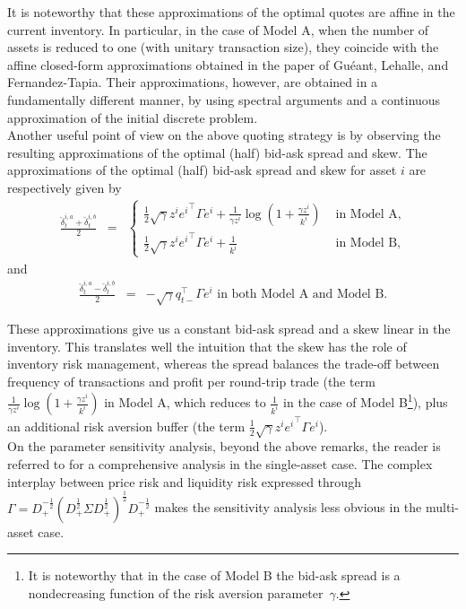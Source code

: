 \documentclass[preprint, 3p]{elsarticle}
\newcommand{\1}{{\chi}}
\begin{document}
It is noteworthy that these approximations of the optimal quotes are affine in the current inventory. In particular, in the case of Model A, when the number of assets is reduced to one (with unitary transaction size), they coincide with the affine closed-form approximations obtained in the paper \cite{gueant2013dealing} of Guéant, Lehalle, and Fernandez-Tapia. Their approximations, however, are obtained in a fundamentally different manner, by using spectral arguments and a continuous approximation of the initial discrete problem.\\

Another useful point of view on the above quoting strategy is by observing the resulting approximations of the optimal (half) bid-ask spread and skew. The approximations of the optimal (half) bid-ask spread and skew for asset $i$ are respectively given by
\begin{eqnarray*}
	\frac{\breve\delta^{i,a}_t + \breve\delta^{i,b}_t}{2} &=& \begin{cases}
 \frac 12 \sqrt{\gamma} z^i {e^i}^\intercal \Gamma e^i
 +\frac{1}{\gamma z^i}\log\left(1+\frac{\gamma z^i}{k^{i}}\right)  &\mbox{ in Model A,}\\
 \frac 12 \sqrt{\gamma} z^i {e^i}^\intercal \Gamma e^i
 +\frac{1}{k^i} &\mbox{ in  Model B,}
\end{cases}
\end{eqnarray*}
and
\begin{eqnarray*}
	\frac{\breve\delta^{i,a}_t - \breve\delta^{i,b}_t}{2} &=&
-\sqrt{\gamma} q_{t-}^\intercal \Gamma e^i \text{ in both Model A and Model B.}
	\end{eqnarray*}

These approximations give us a constant bid-ask spread and a skew linear in the inventory. This translates well the intuition that the skew has the role of inventory risk management, whereas the spread balances the trade-off between frequency of transactions and profit per round-trip trade (the term $\frac{1}{\gamma z^i}\log\left(1+\frac{\gamma z^i}{k^{i}}\right)$ in Model A, which reduces to $\frac{1}{k^i}$ in the case of Model B\footnote{It is noteworthy that in the case of Model B  the bid-ask spread is a nondecreasing function of the risk aversion parameter~$\gamma$.}), plus an additional risk aversion buffer (the term $\frac 12 \sqrt{\gamma} z^i {e^i}^\intercal \Gamma e^i$).\\

On the parameter sensitivity analysis, beyond the above remarks, the reader is referred to \cite{gueant2013dealing} for a comprehensive analysis in the single-asset case. The complex interplay between price risk and liquidity risk expressed through $\Gamma=D_+^{-\frac 1 2}(D_+^{\frac 12}\Sigma D_+^{\frac 12})^{\frac 12} D_+^{-\frac 1 2}$ makes the sensitivity analysis less obvious in the multi-asset case.\\
\end{document}

